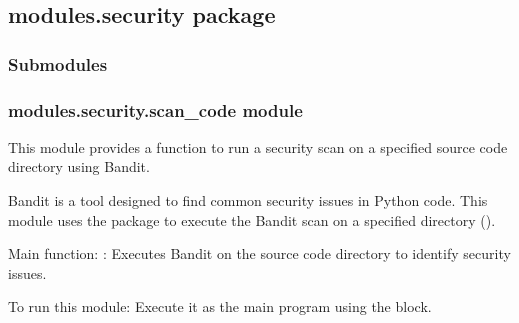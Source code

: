 \documentclass[letterpaper,10pt,english]{sphinxmanual}
\begin{document}
\subsection{modules.security package}
\label{\detokenize{modules.security:modules-security-package}}\label{\detokenize{modules.security::doc}}

\subsubsection{Submodules}
\label{\detokenize{modules.security:submodules}}

\subsubsection{modules.security.scan\_code module}
\label{\detokenize{modules.security:module-modules.security.scan_code}}\label{\detokenize{modules.security:modules-security-scan-code-module}}
\sphinxAtStartPar
This module provides a function to run a security scan on a specified source code directory using Bandit.

\sphinxAtStartPar
Bandit is a tool designed to find common security issues in Python code. This module uses the  package
to execute the Bandit scan on a specified directory ().

\sphinxAtStartPar
Main function:
\sphinxhyphen{} : Executes Bandit on the source code directory to identify security issues.

\sphinxAtStartPar
To run this module:
\sphinxhyphen{} Execute it as the main program using the  block.
\end{document}
